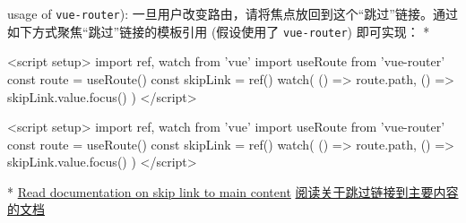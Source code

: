 \begin{paracol}{2}
usage of \texttt{vue-router}):
\switchcolumn
一旦用户改变路由，请将焦点放回到这个``跳过''链接。通过如下方式聚焦``跳过''链接的模板引用
(假设使用了 \texttt{vue-router}) 即可实现：
\switchcolumn[0]*%
\begin{codeHtml}
<script setup>
import { ref, watch } from 'vue'
import { useRoute } from 'vue-router'
const route = useRoute()
const skipLink = ref()
watch(
  () => route.path,
  () => {
    skipLink.value.focus()
  }
)
</script>
\end{codeHtml}
\switchcolumn
\begin{codeHtml}
<script setup>
import { ref, watch } from 'vue'
import { useRoute } from 'vue-router'
const route = useRoute()
const skipLink = ref()
watch(
  () => route.path,
  () => {
    skipLink.value.focus()
  }
)
</script>
\end{codeHtml}
\switchcolumn[0]*%
\href{https://www.w3.org/WAI/WCAG21/Techniques/general/G1.html}{Read
documentation on skip link to main content}
\switchcolumn
\href{https://www.w3.org/WAI/WCAG21/Techniques/general/G1.html}{阅读关于跳过链接到主要内容的文档}
\end{paracol}



